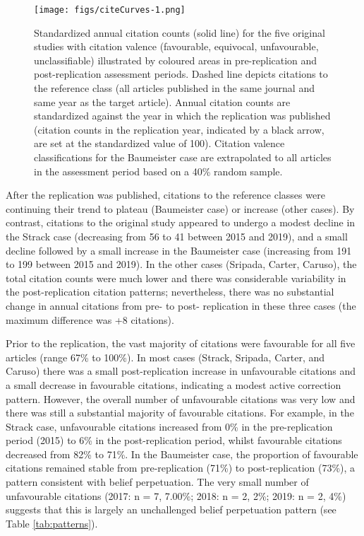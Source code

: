 \documentclass[
  american,
  ,man,floatsintext]{apa6}
\begin{document}
\begin{figure}
\centering
\texttt{[image: figs/citeCurves-1.png]}
\caption{\label{fig:citeCurves}Standardized annual citation counts (solid line) for the five original studies with citation valence (favourable, equivocal, unfavourable, unclassifiable) illustrated by coloured areas in pre-replication and post-replication assessment periods. Dashed line depicts citations to the reference class (all articles published in the same journal and same year as the target article). Annual citation counts are standardized against the year in which the replication was published (citation counts in the replication year, indicated by a black arrow, are set at the standardized value of 100). Citation valence classifications for the Baumeister case are extrapolated to all articles in the assessment period based on a 40\% random sample.}
\end{figure}

After the replication was published, citations to the reference classes were continuing their trend to plateau (Baumeister case) or increase (other cases). By contrast, citations to the original study appeared to undergo a modest decline in the Strack case (decreasing from 56 to 41 between 2015 and 2019), and a small decline followed by a small increase in the Baumeister case (increasing from 191 to 199 between 2015 and 2019). In the other cases (Sripada, Carter, Caruso), the total citation counts were much lower and there was considerable variability in the post-replication citation patterns; nevertheless, there was no substantial change in annual citations from pre- to post- replication in these three cases (the maximum difference was +8 citations).

Prior to the replication, the vast majority of citations were favourable for all five articles (range 67\% to 100\%). In most cases (Strack, Sripada, Carter, and Caruso) there was a small post-replication increase in unfavourable citations and a small decrease in favourable citations, indicating a modest active correction pattern. However, the overall number of unfavourable citations was very low and there was still a substantial majority of favourable citations. For example, in the Strack case, unfavourable citations increased from 0\% in the pre-replication period (2015) to 6\% in the post-replication period, whilst favourable citations decreased from 82\% to 71\%. In the Baumeister case, the proportion of favourable citations remained stable from pre-replication (71\%) to post-replication (73\%), a pattern consistent with belief perpetuation. The very small number of unfavourable citations (2017: n = 7, 7.00\%; 2018: n = 2, 2\%; 2019: n = 2, 4\%) suggests that this is largely an unchallenged belief perpetuation pattern (see Table \ref{tab:patterns}).
\end{document}

